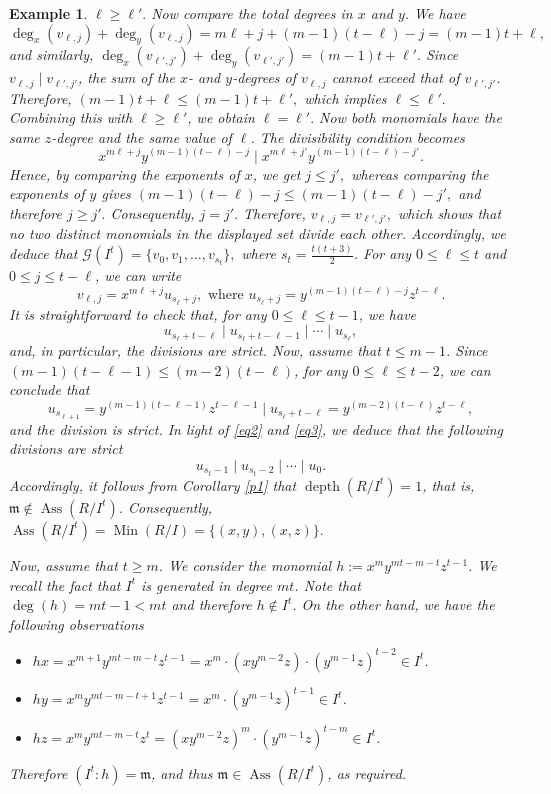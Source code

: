 \documentclass[11pt]{amsart}
\newtheorem{example}[theorem]{Example}
\def\Ass{\operatorname{Ass}}
\def\Min{\operatorname{Min}}
\def\depth{\operatorname{depth}}
\begin{document}
\begin{example}
{ $\ell\geq \ell'.$ Now compare the total degrees in $x$ and $y$. We have
\[
\deg_x(v_{\ell,j})+\deg_y(v_{\ell,j})
=
m\ell+j+(m-1)(t-\ell)-j
=
(m-1)t+\ell,
\]
and similarly, $\deg_x(v_{\ell',j'})+\deg_y(v_{\ell',j'})=(m-1)t+\ell'.$ 
Since $v_{\ell,j}\mid v_{\ell',j'}$, the sum of the $x$- and $y$-degrees
of $v_{\ell,j}$ cannot exceed that of $v_{\ell',j'}$. Therefore,
 $(m-1)t+\ell\leq (m-1)t+\ell',$ which implies $\ell\leq\ell'.$ 
Combining this with $\ell\geq\ell'$, we obtain $\ell=\ell'.$ 
Now both monomials have the same $z$-degree and the same value of
$\ell$. The divisibility condition becomes
\[
x^{m\ell+j}y^{(m-1)(t-\ell)-j}
\mid
x^{m\ell+j'}y^{(m-1)(t-\ell)-j'}.
\]
Hence, by comparing the exponents of $x$, we get $j\leq j',$ whereas comparing the exponents of $y$ gives
$(m-1)(t-\ell)-j \leq (m-1)(t-\ell)-j',$ and therefore $j\geq j'.$ Consequently, $j=j'.$ Therefore,
$v_{\ell,j}=v_{\ell',j'},$ which shows that no two distinct monomials in the displayed set divide
each other. Accordingly, we deduce that 
$\mathcal{G}(I^t)=\{v_0,v_1,\ldots,v_{s_t}\},$ where $s_t=\frac{t(t+3)}{2}$.  
For any $0\leq \ell\leq t$ and $0\leq j\leq t-\ell$, we can write
$$v_{\ell,j}=x^{m\ell+j}u_{s_{\ell}+j},\text{ where }u_{s_{\ell}+j}=y^{(m-1)(t-\ell)-j}z^{t-\ell}.$$
It is straightforward to check that, for  any $0\leq \ell\leq t-1$, we have  
\begin{equation}\label{eq2}
u_{s_{\ell}+t-\ell}\mid u_{s_{\ell}+t-\ell-1}\mid \cdots \mid u_{s_{\ell}},
\end{equation}
and, in particular,  the divisions are strict. Now, assume that $t\leq m-1$. Since $(m-1)(t-\ell-1)\leq (m-2)(t-\ell)$, 
for any $0\leq \ell\leq t-2$, we can conclude that 
\begin{equation}\label{eq3}
u_{s_{\ell+1}} = y^{(m-1)(t-\ell-1)}z^{t-\ell-1} \mid u_{s_{\ell}+t-\ell} = y^{(m-2)(t-\ell)}z^{t-\ell},
\end{equation}
and the division is strict. In light of  \eqref{eq2} and \eqref{eq3}, we deduce that the following divisions are strict  
$$u_{s_t-1}\mid u_{s_t-2} \mid \cdots \mid u_0.$$
Accordingly,  it follows from  Corollary \ref{p1}  that $\depth(R/I^t)=1$, that is,  $\mathfrak m\notin \Ass(R/I^t)$.
Consequently, $\Ass(R/I^t)=\Min(R/I)=\{(x,y),(x,z)\}.$

 Now, assume that  $t\geq m$. We consider the monomial $h:=x^m y^{mt-m-t} z^{t-1}$.
We recall the fact that $I^t$ is generated in degree $mt$.
Note that $\deg(h)=mt-1<mt$ and therefore $h\notin I^t$. On the other hand, we have the following observations
\begin{itemize}
\item $hx = x^{m+1} y^{mt-m-t} z^{t-1} = x^m \cdot (xy^{m-2}z)\cdot (y^{m-1}z)^{t-2}\in I^t$.
\item $hy = x^m y^{mt-m-t+1} z^{t-1} = x^m\cdot (y^{m-1}z)^{t-1} \in I^t$.
\item $hz = x^m y^{mt-m-t} z^t = (xy^{m-2}z)^m\cdot (y^{m-1}z)^{t-m}\in I^t$.
\end{itemize}
Therefore $(I^t:h)=\mathfrak m$, and thus $\mathfrak m\in\Ass(R/I^t)$, as required.
}
\end{example}
\end{document}
